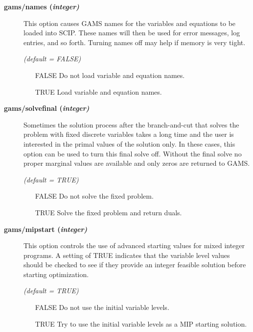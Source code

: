 \begin{description}
\item[\label{scipnames}\hypertarget{scipnames}
{\textbf{gams/names (\slshape{integer})}}]\hspace{1.0in}

This option causes GAMS names for the variables and equations to be loaded into SCIP.
These names will then be used for error messages, log entries, and so forth.
Turning names off may help if memory is very tight.

\textsl{(default = FALSE)}
\begin{itemize}
\item[FALSE] Do not load variable and equation names.
\item[TRUE] Load variable and equation names.
\end{itemize}


\item[\label{scipsolvefinal}\hypertarget{scipsolvefinal}
{\textbf{gams/solvefinal (\slshape{integer})}}]\hspace{1.0in}

Sometimes the solution process after the branch-and-cut that solves the problem with fixed discrete variables takes a long time and the user is interested in the primal values of the solution only.
In these cases, this option can be used to turn this final solve off.
Without the final solve no proper marginal values are available and only zeros are returned to GAMS.

\textsl{(default = TRUE)}
\begin{itemize}
\item[FALSE] Do not solve the fixed problem.
\item[TRUE] Solve the fixed problem and return duals.
\end{itemize}


\item[\label{scipmipstart}\hypertarget{scipmipstart}
{\textbf{gams/mipstart (\slshape{integer})}}]\hspace{1.0in}

This option controls the use of advanced starting values for mixed integer programs.
A setting of TRUE indicates that the variable level values should be checked to see if they provide an integer feasible solution before starting optimization.

\textsl{(default = TRUE)}
\begin{itemize}
\item[FALSE] Do not use the initial variable levels.
\item[TRUE] Try to use the initial variable levels as a MIP starting solution.
\end{itemize}



\end{description}
